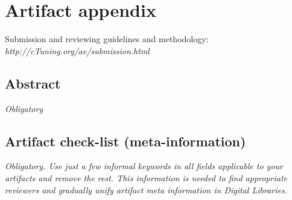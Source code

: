 \documentclass{sigplanconf}
\begin{document}


\appendix
\section{Artifact appendix}

Submission and reviewing guidelines and methodology: \\
{\em http://cTuning.org/ae/submission.html}

\subsection{Abstract}

{\em Obligatory}

\subsection{Artifact check-list (meta-information)}

{\em Obligatory. Use just a few informal keywords in all fields applicable to your artifacts
and remove the rest. This information is needed to find appropriate reviewers and gradually 
unify artifact meta information in Digital Libraries.}
\end{document}

